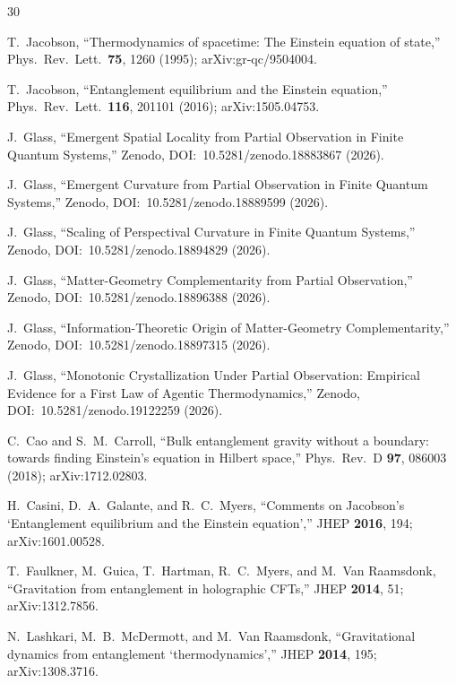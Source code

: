 \documentclass[aps,pra,twocolumn,superscriptaddress,floatfix]{revtex4-2}
\begin{document}
\begin{thebibliography}{30}

T.~Jacobson,
``Thermodynamics of spacetime: The Einstein equation of state,''
Phys.\ Rev.\ Lett.\ \textbf{75}, 1260 (1995);
arXiv:gr-qc/9504004.

T.~Jacobson,
``Entanglement equilibrium and the Einstein equation,''
Phys.\ Rev.\ Lett.\ \textbf{116}, 201101 (2016);
arXiv:1505.04753.

J.~Glass, ``Emergent Spatial Locality from Partial Observation
in Finite Quantum Systems,''
Zenodo, DOI:~10.5281/zenodo.18883867 (2026).

J.~Glass, ``Emergent Curvature from Partial Observation
in Finite Quantum Systems,''
Zenodo, DOI:~10.5281/zenodo.18889599 (2026).

J.~Glass, ``Scaling of Perspectival Curvature in Finite
Quantum Systems,''
Zenodo, DOI:~10.5281/zenodo.18894829 (2026).

J.~Glass, ``Matter-Geometry Complementarity from Partial
Observation,''
Zenodo, DOI:~10.5281/zenodo.18896388 (2026).

J.~Glass, ``Information-Theoretic Origin of Matter-Geometry
Complementarity,''
Zenodo, DOI:~10.5281/zenodo.18897315 (2026).

J.~Glass, ``Monotonic Crystallization Under Partial Observation:
Empirical Evidence for a First Law of Agentic Thermodynamics,''
Zenodo, DOI:~10.5281/zenodo.19122259 (2026).

C.~Cao and S.~M.~Carroll,
``Bulk entanglement gravity without a boundary: towards finding Einstein's equation in Hilbert space,''
Phys.\ Rev.\ D \textbf{97}, 086003 (2018);
arXiv:1712.02803.

H.~Casini, D.~A.~Galante, and R.~C.~Myers,
``Comments on Jacobson's `Entanglement equilibrium and the Einstein equation',''
JHEP \textbf{2016}, 194;
arXiv:1601.00528.

T.~Faulkner, M.~Guica, T.~Hartman, R.~C.~Myers, and M.~Van Raamsdonk,
``Gravitation from entanglement in holographic CFTs,''
JHEP \textbf{2014}, 51;
arXiv:1312.7856.

N.~Lashkari, M.~B.~McDermott, and M.~Van Raamsdonk,
``Gravitational dynamics from entanglement `thermodynamics',''
JHEP \textbf{2014}, 195;
arXiv:1308.3716.


\end{thebibliography}
\end{document}
